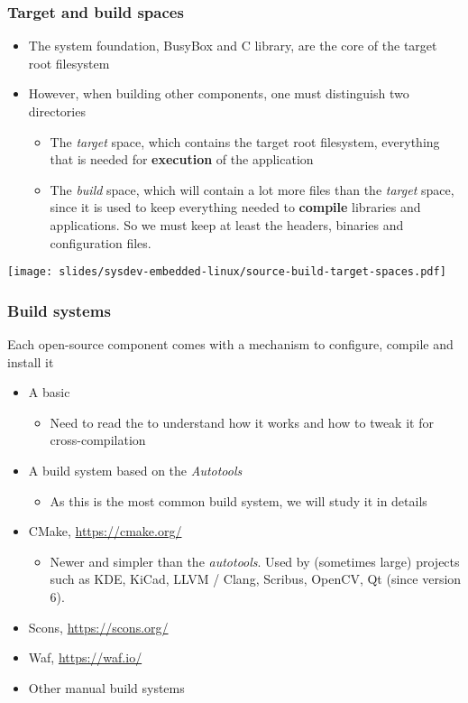 \begin{frame}
  \frametitle{Target and build spaces}
  \begin{itemize}
  \item The system foundation, BusyBox and C library, are the core of
    the target root filesystem
  \item However, when building other components, one must distinguish
    two directories
    \begin{itemize}
    \item The {\em target} space, which contains the target root
      filesystem, everything that is needed for {\bf execution} of the
      application
    \item The {\em build} space, which will contain a lot more files
      than the {\em target} space, since it is used to keep everything
      needed to {\bf compile} libraries and applications. So we must
      keep at least the headers, binaries and configuration files.
    \end{itemize}
  \end{itemize}
  \texttt{[image: slides/sysdev-embedded-linux/source-build-target-spaces.pdf]}
\end{frame}

\begin{frame}
  \frametitle{Build systems}
  Each open-source component comes with a mechanism to
  configure, compile and install it
  \begin{itemize}
  \item A basic 
    \begin{itemize}
    \item Need to read the  to understand how it
      works and how to tweak it for cross-compilation
    \end{itemize}
  \item A build system based on the {\em Autotools}
    \begin{itemize}
    \item As this is the most common build system, we will study it
      in details
    \end{itemize}
  \item CMake, \url{https://cmake.org/}
    \begin{itemize}
    \item Newer and simpler than the {\em autotools}. Used by
    (sometimes large) projects such as KDE, KiCad, LLVM / Clang,
    Scribus, OpenCV, Qt (since version 6).
    \end{itemize}
  \item Scons, \url{https://scons.org/}
  \item Waf, \url{https://waf.io/}
  \item Other manual build systems
  \end{itemize}
\end{frame}

